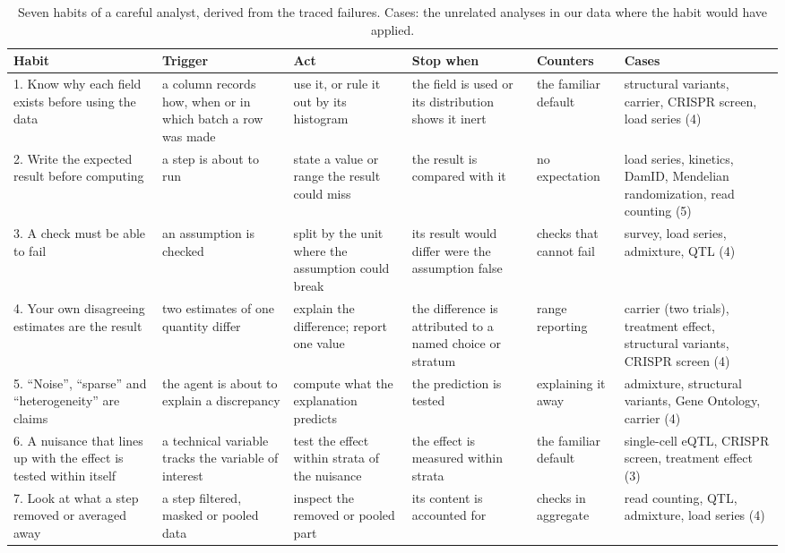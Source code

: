 \documentclass[10pt]{article}
\renewcommand{\arraystretch}{1.12}
\begin{document}
\begin{table}[!htb]
\centering\small
\footnotesize\caption{Seven habits of a careful analyst, derived from the traced failures. Cases: the unrelated analyses in our data where the habit would have applied.}
\label{tab:habits}
\setlength{\tabcolsep}{4pt}\renewcommand{\arraystretch}{1.0}\begin{tabularx}{\textwidth}{@{}P{2.9cm}P{2.6cm}LP{2.5cm}P{1.75cm}P{3.0cm}@{}}
\toprule
Habit & Trigger & Act & Stop when & Counters & Cases\\
. Know why each field exists before using the data & a column records how, when or in which batch a row was made & use it, or rule it out by its histogram & the field is used or its distribution shows it inert & the familiar default & structural variants, carrier, CRISPR screen, load series (4)\\
2. Write the expected result before computing & a step is about to run & state a value or range the result could miss & the result is compared with it & no expectation & load series, kinetics, DamID, Mendelian randomization, read counting (5)\\
3. A check must be able to fail & an assumption is checked & split by the unit where the assumption could break & its result would differ were the assumption false & checks that cannot fail & survey, load series, admixture, QTL (4)\\
4. Your own disagreeing estimates are the result & two estimates of one quantity differ & explain the difference; report one value & the difference is attributed to a named choice or stratum & range reporting & carrier (two trials), treatment effect, structural variants, CRISPR screen (4)\\
5. ``Noise'', ``sparse'' and ``heterogeneity'' are claims & the agent is about to explain a discrepancy & compute what the explanation predicts & the prediction is tested & explaining it away & admixture, structural variants, Gene Ontology, carrier (4)\\
6. A nuisance that lines up with the effect is tested within itself & a technical variable tracks the variable of interest & test the effect within strata of the nuisance & the effect is measured within strata & the familiar default & single-cell eQTL, CRISPR screen, treatment effect (3)\\
7. Look at what a step removed or averaged away & a step filtered, masked or pooled data & inspect the removed or pooled part & its content is accounted for & checks in aggregate & read counting, QTL, admixture, load series (4)\\
\bottomrule
\end{tabularx}
\end{table}
\end{document}
